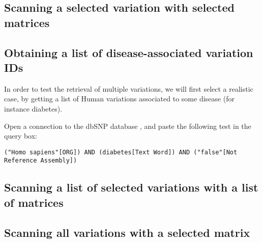 \subsection{Scanning a selected variation with selected matrices}

\tbw

\subsection{Obtaining a list of disease-associated variation IDs}

In order to test the retrieval of multiple variations, we will first
select a realistic case, by getting a list of Human variations
associated to some disease (for instance diabetes).

Open a connection to the dbSNP database
, and paste the following
test in the query box:

\begin{lstlisting}
("Homo sapiens"[ORG]) AND (diabetes[Text Word]) AND ("false"[Not Reference Assembly])
\end{lstlisting}

\tbw


\subsection{Scanning a list of selected variations with a list of matrices}

\tbw

\subsection{Scanning all variations with a selected matrix}

\tbw



